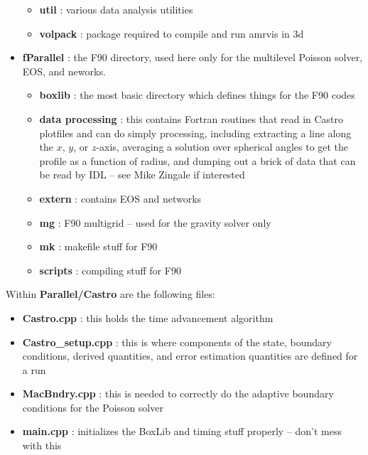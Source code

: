 \begin{itemize}
\begin{itemize}
  \item {\bf util}       : various data analysis utilities
  \item {\bf volpack}    : package required to compile and run amrvis in 3d
  \end{itemize}
\item {\bf fParallel} : the F90 directory, used here only for the multilevel Poisson solver,
                        EOS, and neworks.
  \begin{itemize}
  \item {\bf boxlib}  : the most basic directory which defines things for the F90 codes
  \item {\bf data processing} : this contains Fortran routines that read in Castro plotfiles and can do
                                simply processing, including extracting a line along the $x$, $y$, or $z$-axis,
                                averaging a solution over spherical angles to get the profile as a function
                                of radius, and dumping out a brick of data that can be read by IDL -- see 
                                Mike Zingale if interested
  \item {\bf extern}  : contains EOS and networks
  \item {\bf mg}      : F90 multigrid -- used for the gravity solver only
  \item {\bf mk}      : makefile stuff for F90
  \item {\bf scripts} : compiling stuff for F90
  \end{itemize}
\end{itemize}

Within {\bf Parallel/Castro} are the following files:

  \begin{itemize}
  \item {\bf Castro.cpp}        : this holds the time advancement algorithm 
  \item {\bf Castro\_setup.cpp} : this is where components of the state, boundary 
                                  conditions, derived quantities, and error estimation 
                                  quantities are defined for a run
  \item {\bf MacBndry.cpp}      : this is needed to correctly do the adaptive boundary 
                                  conditions for the Poisson solver
  \item {\bf main.cpp}          : initializes the BoxLib and timing stuff properly -- don't 
                                  mess with this
\end{itemize}
